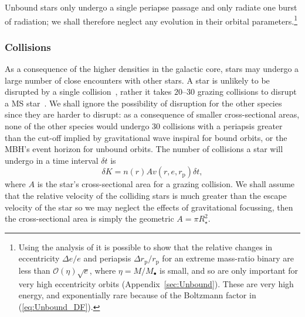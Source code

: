 \documentclass[useAMS,usedcolumn,usegraphicx,usenatbib]{mn2e}
\newcommand{\eqnref}[1]{(\ref{eq:#1})}
\newcommand{\apref}[1]{Appendix~\ref{sec:#1}}
\newcommand{\sub}[1]{\ensuremath{_\mathrm{#1}}}
\newcommand{\order}[1]{\ensuremath{\mathcal{O}({#1})}}
\begin{document}
Unbound stars only undergo a single periapse passage and only radiate one burst of radiation; we shall therefore neglect any evolution in their orbital parameters.\footnote{Using the analysis of \citet{Turner1977} it is possible to show that the relative changes in eccentricity $\Delta e / e$ and periapsis $\Delta r\sub{p} / r\sub{p}$ for an extreme mass-ratio binary are less than $\order{\eta}\sqrt{e}$, where $\eta = M/M_\bullet$ is small, and so are only important for very high eccentricity orbits (\apref{Unbound}). These are very high energy, and exponentially rare because of the Boltzmann factor in \eqnref{Unbound_DF}.}

\subsubsection{Collisions}

As a consequence of the higher densities in the galactic core, stars may undergo a large number of close encounters with other stars. A star is unlikely to be disrupted by a single collision~\citep{Freitag2005}, rather it takes $20$--$30$ grazing collisions to disrupt a MS star~\citep{Freitag2006}. We shall ignore the possibility of disruption for the other species since they are harder to disrupt: as a consequence of smaller cross-sectional areas, none of the other species would undergo 30 collisions with a periapsis greater than the cut-off implied by gravitational wave inspiral for bound orbits, or the MBH's event horizon for unbound orbits. The number of collisions a star will undergo in a time interval $\delta t$ is
\begin{equation}
\delta K = n(r) A v(r,e,r\sub{p})\delta t,
\end{equation}
where $A$ is the star's cross-sectional area for a grazing collision. We shall assume that the relative velocity of the colliding stars is much greater than the escape velocity of the star so we may neglect the effects of gravitational focussing, then the cross-sectional area is simply the geometric $A = \pi R_\star^2$.
\end{document}
